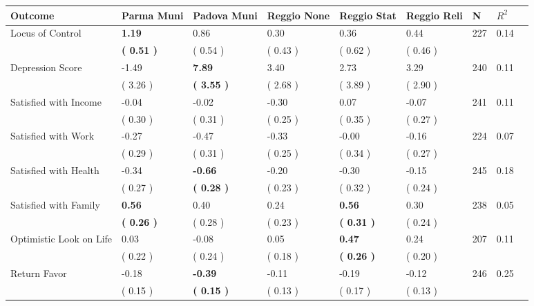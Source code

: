 \begin{tabular}{L{6.2cm} C{1.8cm} C{1.8cm} C{1.8cm} C{1.8cm} C{1.8cm} C{1.8cm} C{0.3cm} C{0.3cm}}
\toprule
 \textbf{Outcome} & \textbf{Parma Muni} & \textbf{Padova Muni} & \textbf{Reggio None} & \textbf{Reggio Stat} & \textbf{Reggio Reli} & \textbf{N} & \textbf{$ R^2$} \\
\midrule
Locus of Control & \textbf{     1.19} &      0.86 &      0.30 &      0.36 &      0.44  & 227 &       0.14 \\ 
 & \textbf{(     0.51 )} & (     0.54 ) & (     0.43 ) & (     0.62 ) & (     0.46 )  & \\
Depression Score &     -1.49 & \textbf{     7.89} &      3.40 &      2.73 &      3.29  & 240 &       0.11 \\ 
 & (     3.26 ) & \textbf{(     3.55 )} & (     2.68 ) & (     3.89 ) & (     2.90 )  & \\
Satisfied with Income &     -0.04 &     -0.02 &     -0.30 &      0.07 &     -0.07  & 241 &       0.11 \\ 
 & (     0.30 ) & (     0.31 ) & (     0.25 ) & (     0.35 ) & (     0.27 )  & \\
Satisfied with Work &     -0.27 &     -0.47 &     -0.33 &     -0.00 &     -0.16  & 224 &       0.07 \\ 
 & (     0.29 ) & (     0.31 ) & (     0.25 ) & (     0.34 ) & (     0.27 )  & \\
Satisfied with Health &     -0.34 & \textbf{    -0.66} &     -0.20 &     -0.30 &     -0.15  & 245 &       0.18 \\ 
 & (     0.27 ) & \textbf{(     0.28 )} & (     0.23 ) & (     0.32 ) & (     0.24 )  & \\
Satisfied with Family & \textbf{     0.56} &      0.40 &      0.24 & \textbf{     0.56} &      0.30  & 238 &       0.05 \\ 
 & \textbf{(     0.26 )} & (     0.28 ) & (     0.23 ) & \textbf{(     0.31 )} & (     0.24 )  & \\
Optimistic Look on Life &      0.03 &     -0.08 &      0.05 & \textbf{     0.47} &      0.24  & 207 &       0.11 \\ 
 & (     0.22 ) & (     0.24 ) & (     0.18 ) & \textbf{(     0.26 )} & (     0.20 )  & \\
Return Favor &     -0.18 & \textbf{    -0.39} &     -0.11 &     -0.19 &     -0.12  & 246 &       0.25 \\ 
 & (     0.15 ) & \textbf{(     0.15 )} & (     0.13 ) & (     0.17 ) & (     0.13 )  & \\

\end{tabular}
